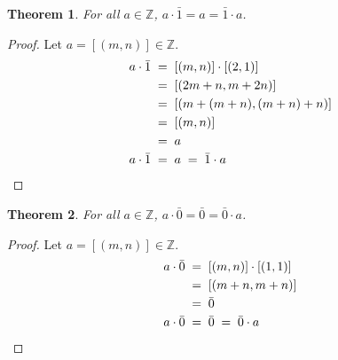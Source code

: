\documentclass[10pt]{article}
\newtheorem{theorem}{Theorem}[section]
\theoremstyle{definition}
\theoremstyle{remark}
\newcommand{\Z}{\mathbb{Z}}
\begin{document}
        \begin{theorem}
                For all $a \in \Z$, $a\cdot\bar{1} = a = \bar{1}\cdot a$.
        \end{theorem}
        \begin{proof}
                Let $a = [(m, n)] \in \Z$.
                \begin{align*}
                        a\cdot \bar{1} \;&=\; [(m, n)] \cdot [(2, 1)] \\
                                \;&=\; [(2m + n, m + 2n)] \\
                                \;&=\; [(m + (m + n), (m + n) + n)] \\
                                \;&=\; [(m, n)] \\
                                \;&=\; a \\
                        a\cdot \bar{1} \;&=\; a \;=\; \bar{1}\cdot a \qedhere
                \end{align*}
        \end{proof}
        \begin{theorem}
                For all $a \in \Z$, $a\cdot \bar{0} = \bar{0} = \bar{0}\cdot a$.
        \end{theorem}
        \begin{proof}
                Let $a = [(m, n)] \in \Z$.
                \begin{align*}
                        a\cdot \bar{0} \;&=\; [(m, n)]\cdot [(1, 1)]\\
                                \;&=\; [(m + n, m + n)] \\
                                \;&=\; \bar{0} \\
                        a\cdot \bar{0} \;&=\; \bar{0} \;=\; \bar{0}\cdot a \qedhere
                \end{align*}
        \end{proof}
\end{document}
